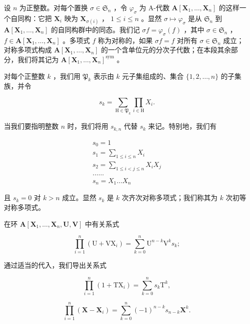 设 \(n\) 为正整数。对每个置换 \(\sigma \in \mathfrak{S}_n\) ，令 \(\varphi_{\sigma}\) 为 A-代数 \(\mathbf{A}[\mathbf{X}_1, \ldots, \mathbf{X}_n]\) 的这样一个自同构：它把 \(\mathbf{X}_i\) 映为 \(\mathbf{X}_{\sigma(i)}\) ， \(1 \leqslant i \leqslant n\) 。显然 \(\sigma \mapsto \varphi_{\sigma}\) 是从 \(\mathfrak{S}_n\) 到 \(\mathbf{A}[\mathbf{X}_1, \ldots, \mathbf{X}_n]\) 的自同构群中的同态。我们记 \(\sigma f = \varphi_{\sigma}(f)\) ，其中 \(\sigma \in \mathfrak{S}_n\) ， \(f \in \mathbf{A}[\mathbf{X}_1, \ldots, \mathbf{X}_n]\) 。多项式 \(f\) 称为对称的，如果 \(\sigma f = f\) 对所有 \(\sigma \in \mathfrak{S}_n\) 成立；对称多项式构成 \(\mathbf{A}[\mathbf{X}_1, \ldots, \mathbf{X}_n]\) 的一个含单位元的分次子代数；在本段其余部分，我们将其记为 \(\mathbf{A}[\mathbf{X}_1, \ldots, \mathbf{X}_n]^{\text{sym}}\) 。

对每个正整数 \(k\) ，我们用 \(\mathfrak{P}_k\) 表示由 \(k\) 元子集组成的、集合 \(\{1, 2, \ldots, n\}\) 的子集族，并令

\[
s _ {k} = \sum_ {\mathrm{H} \in \mathfrak {P} _ {k}} \prod_ {i \in \mathrm{H}} X _ {i}.\tag{1}
\]

当我们要指明整数 \(n\) 时，我们将用 \(s_{k,n}\) 代替 \(s_k\) 来记。特别地，我们有

\[
\begin{array}{l} s _ {0} = 1 \\ s _ {1} = \sum_ {1 \leqslant i \leqslant n} X _ {i} \\ s _ {2} = \sum_ {1 \leqslant i <   j \leqslant n} X _ {i} X _ {j} \\ \dots \dots \\ s _ {n} = X _ {1} \dots X _ {n} \end{array}
\]

且 \(s_k = 0\) 对 \(k > n\) 成立。显然 \(s_k\) 是 \(k\) 次齐次对称多项式；我们称其为 \(k\) 次初等对称多项式。

在环 \(\mathbf{A}[\mathbf{X}_1,\dots ,\mathbf{X}_n,\mathbf{U},\mathbf{V}]\) 中有关系式

\[
\prod_ {i = 1} ^ {n} \left(\mathrm{U} + \mathrm{VX} _ {i}\right) = \sum_ {k = 0} ^ {n} \mathrm{U} ^ {n - k} \mathrm{V} ^ {k} s _ {k};\tag{2}
\]

通过适当的代入，我们导出关系式

\[
\prod_ {i = 1} ^ {n} \left(1 + \mathrm{TX} _ {i}\right) = \sum_ {k = 0} ^ {n} s _ {k} \mathrm{T} ^ {k},\tag{3}
\]

\[
\prod_ {i = 1} ^ {n} \left(\mathbf {X} - \mathbf {X} _ {i}\right) = \sum_ {k = 0} ^ {n} (- 1) ^ {n - k} s _ {n - k} \mathbf {X} ^ {k}.\tag{4}
\]

